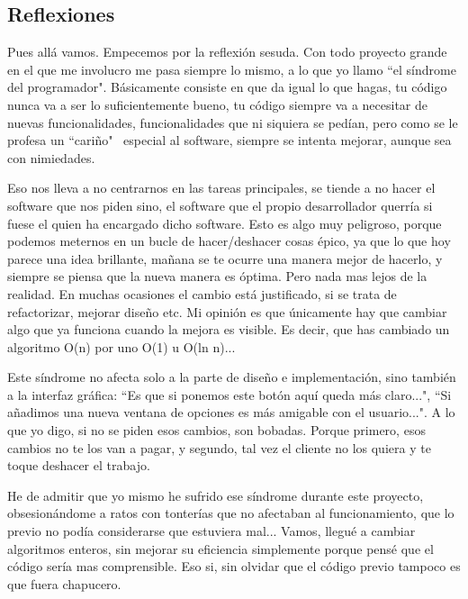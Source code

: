 \subsection{Reflexiones}
Pues all\'a vamos. Empecemos por la reflexi\'on sesuda.
Con todo proyecto grande en el que me involucro me pasa siempre lo mismo, a lo que yo llamo
``el  s\'indrome del programador". B\'asicamente consiste en que da igual lo que hagas,
tu c\'odigo nunca va a ser lo suficientemente bueno, tu c\'odigo siempre va a necesitar
de nuevas funcionalidades, funcionalidades que ni siquiera se ped\'ian, pero como se le profesa
un ``cari\~no" \ especial al software, siempre se intenta mejorar, aunque sea con nimiedades.

Eso nos lleva a no centrarnos en las tareas principales, se tiende a no hacer el software que nos piden
sino, el software que el propio desarrollador querr\'ia si fuese el quien ha encargado dicho software.
Esto es algo muy peligroso, porque podemos meternos en un bucle de hacer/deshacer cosas \'epico, ya que
lo que hoy parece una idea brillante, ma\~nana se te ocurre una manera mejor de hacerlo, y siempre
se piensa que la nueva manera es \'optima. Pero nada mas lejos de la realidad. En muchas ocasiones el
cambio est\'a justificado, si se trata de refactorizar, mejorar dise\~no etc. Mi opini\'on es que \'unicamente
hay que cambiar algo que ya funciona cuando la mejora es visible. Es decir, que has cambiado un algoritmo O(n)
por uno O(1) u O(ln n)...

Este s\'indrome no afecta solo a la parte de dise\~no e implementaci\'on, sino tambi\'en a la interfaz gr\'afica:
``Es que si ponemos este bot\'on aqu\'i queda m\'as claro...", ``Si a\~nadimos una nueva ventana de opciones es m\'as
amigable con el usuario...". A lo que yo digo, si no se piden esos cambios, son bobadas. Porque primero, esos cambios
no te los van a pagar, y segundo, tal vez el cliente no los quiera y te toque deshacer el trabajo.

He de admitir que yo mismo he sufrido ese s\'indrome durante este proyecto, obsesion\'andome a ratos con tonter\'ias
que no afectaban al funcionamiento, que lo previo no pod\'ia considerarse que estuviera mal... Vamos, llegu\'e a cambiar
algoritmos enteros, sin mejorar su eficiencia simplemente porque pens\'e que el c\'odigo ser\'ia mas comprensible. Eso si,
sin olvidar que el c\'odigo previo tampoco es que fuera chapucero.

